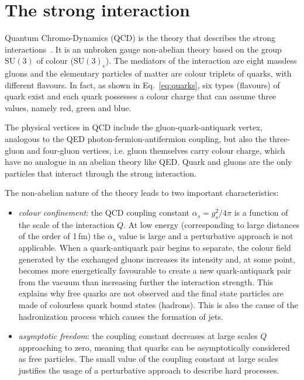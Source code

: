 \section{The strong interaction}
\label{sec:QCD}

Quantum Chromo-Dynamics (QCD) is the theory that describes the strong interactions~\cite{Ellis:1991qj}. It is an unbroken gauge non-abelian theory based on the group $\mathrm{SU(3)}$ of colour ($\mathrm{SU(3)_c}$). The mediators of the interaction are eight massless gluons and the elementary particles of matter are colour triplets of quarks, with different flavours. In fact, as shown in Eq.~\eqref{eq:quarks}, six types (flavours) of quark exist and each quark possesses a colour charge that can assume three values, namely red, green and blue.

The physical vertices in QCD include the gluon-quark-antiquark vertex, analogous to the QED photon-fermion-antifermion coupling, but also the three-gluon and four-gluon vertices, i.e. gluon themselves carry colour charge, which have no analogue in an abelian theory like QED. Quark and gluons are the only particles that interact through the strong interaction.

The non-abelian nature of the theory leads to two important characteristics:
\begin{itemize}
\item \emph{colour confinement}: the QCD coupling constant $\alpha_s = g_s^2/4\pi$ is a function of the scale of the interaction $Q$. At low energy (corresponding to large distances of the order of 1\,fm) the $\alpha_s$ value is large and a perturbative approach is not applicable. When a quark-antiquark pair begins to separate, the colour field generated by the exchanged gluons increases its intensity and, at some point, becomes more energetically favourable to create a new quark-antiquark pair from the vacuum than increasing further the interaction strength. This explains why free quarks are not observed and the final state particles are made of colourless quark bound states (hadrons). This is also the cause of the hadronization process which causes the formation of jets.

\item \emph{asymptotic freedom}: the coupling constant decreases at large scales $Q$ approaching to zero, meaning that quarks can be asymptotically considered as free particles. The small value of the coupling constant at large scales justifies the usage of a perturbative approach to describe hard processes.
\end{itemize}



